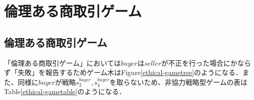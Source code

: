 
\section{倫理ある商取引ゲーム}

\subsection{倫理ある商取引ゲーム}
「倫理ある商取引ゲーム」においては$buyer$は$seller$が不正を行った場合にかならず「失敗」を報告するためゲーム木はFigure\ref{ethical-gametree}のようになる．また、同様に$buyer$が戦略$s^{buyer}_2, s^{buyer}_4$を取らないため、非協力戦略型ゲームの表はTable\ref{ethical-gametable}のようになる．


%

